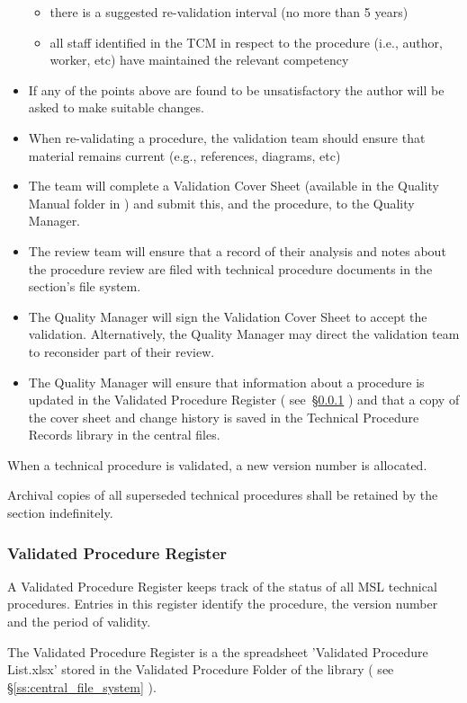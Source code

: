 \begin{itemize}
\begin{itemize}
\item there is a suggested re-validation interval (no more than 5 years)
\item all staff identified in the TCM in respect to the procedure (i.e., author, worker, etc) have maintained the relevant competency
\end{itemize}
\item If any of the points above are found to be unsatisfactory the author will be asked to make suitable changes.
\item When re-validating a procedure, the validation team should ensure that material remains current (e.g., references, diagrams, etc)
\item The team will complete a Validation Cover Sheet (available in the Quality Manual folder in ) and submit this, and the procedure, to the Quality Manager. 
\item The review team will ensure that a record of their analysis and notes about the procedure review are filed with technical procedure documents in the section’s file system. 
\item The Quality Manager will sign the Validation Cover Sheet to accept the validation. Alternatively, the Quality Manager may direct the validation team to reconsider part of their review.
\item The Quality Manager will ensure that information about a procedure is updated in the Validated Procedure Register ( see~\S\ref{sss:validated_procedure_register} ) and that a copy of the cover sheet and change history is saved in the Technical Procedure Records library in the central files.
\end{itemize}

When a technical procedure is validated, a new version number is allocated. 

Archival copies of all superseded technical procedures shall be retained by the section indefinitely.

\subsubsection{Validated Procedure Register}
\label{sss:validated_procedure_register}
A Validated Procedure Register keeps track of the status of all MSL technical procedures. Entries in this register identify the procedure, the version number and the period of validity.

The Validated Procedure Register is a the spreadsheet 'Validated Procedure List.xlsx' stored in the Validated Procedure Folder of the  library ( see \S\ref{ss:central_file_system} ). 

